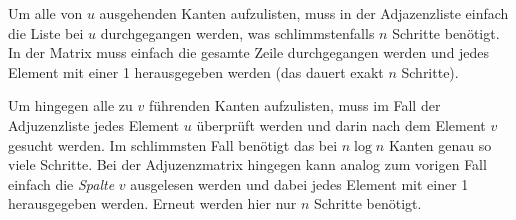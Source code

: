 \documentclass{article}
\begin{document}
    Um alle von $u$ ausgehenden Kanten aufzulisten, muss in der Adjazenzliste einfach die Liste bei $u$ durchgegangen werden, was schlimmstenfalls $n$ Schritte benötigt. In der Matrix muss einfach die gesamte Zeile durchgegangen werden und jedes Element mit einer 1 herausgegeben werden (das dauert exakt $n$ Schritte). 

    Um hingegen alle zu $v$ führenden Kanten aufzulisten, muss im Fall der Adjuzenzliste jedes Element $u$ überprüft werden und darin nach dem Element $v$ gesucht werden. Im schlimmsten Fall benötigt das bei $n \log n$ Kanten genau so viele Schritte. Bei der Adjuzenzmatrix hingegen kann analog zum vorigen Fall einfach die \textit{Spalte} $v$ ausgelesen werden und dabei jedes Element mit einer 1 herausgegeben werden. Erneut werden hier nur $n$ Schritte benötigt.
    
\end{document}
